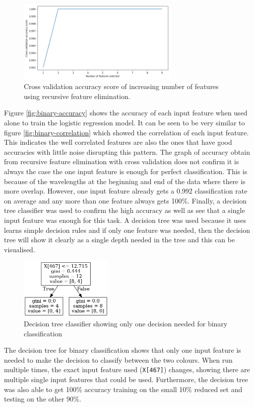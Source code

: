 \documentclass{article}
\begin{document}
\begin{figure}[H]
\centering
\includegraphics[width=0.7\textwidth, keepaspectratio]{imgs/binary-numfeatures.png}
\caption{Cross validation accuracy score of increasing number of features using recursive feature elimination.}
\label{fig:binary-accuracyrfecv}
\end{figure}
\noindent
Figure \ref{fig:binary-accuracy} shows the accuracy of each input feature when used alone to train the logistic regression model. It can be seen to be very similar to figure \ref{fig:binary-correlation} which showed the correlation of each input feature. This indicates the well correlated features are also the ones that have good accuracies with little noise disrupting this pattern. The graph of accuracy obtain from recursive feature elimination with cross validation does not confirm it is always the case the one input feature is enough for perfect classification. This is because of the wavelengths at the beginning and end of the data where there is more overlap. However, one input feature already gets a 0.992 classification rate on average and any more than one feature always gets 100\%. 
\n
Finally, a decision tree classifier was used to confirm the high accuracy as well as see that a single input feature was enough for this task. A decision tree was used because it uses learns simple decision rules and if only one feature was needed, then the decision tree will show it clearly as a single depth needed in the tree and this can be visualised. 
\begin{figure}[H]
\centering
\includegraphics[width=0.4\textwidth, keepaspectratio]{imgs/binary-decisiontree.png}
\caption{Decision tree classifier showing only one decision needed for binary classification}
\end{figure}
\noindent
The decision tree for binary classification shows that only one input feature is needed to make the decision to classify between the two colours. When run multiple times, the exact input feature used (\texttt{X[467]}) changes, showing there are multiple single input features that could be used. Furthermore, the decision tree was also able to get 100\% accuracy training on the small  10\% reduced set and testing on the other 90\%. 
\end{document}
